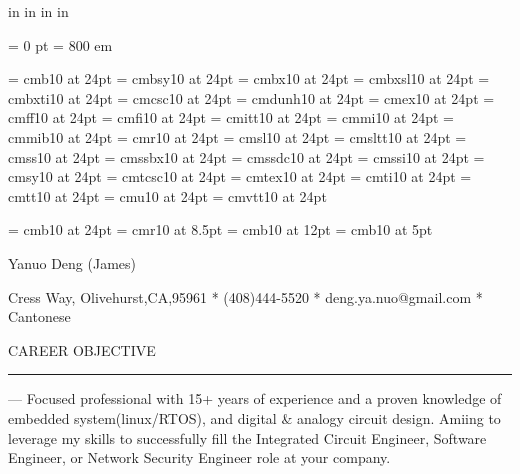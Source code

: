 \nopagenumbers

 in     %
 in    %
 in  %
 in  %

\parindent = 0 pt
\emergencystretch = 800 em


\font\FFcmb=      cmb10            at 24pt
\font\FFcmbsy=    cmbsy10          at 24pt
\font\FFcmbx=     cmbx10           at 24pt
\font\FFcmbxsl=   cmbxsl10         at 24pt
\font\FFcmbxti=   cmbxti10         at 24pt
\font\FFcmcsc=    cmcsc10          at 24pt
\font\FFcmdunh=   cmdunh10         at 24pt
\font\FFcmex=     cmex10           at 24pt
\font\FFcmff=     cmff10           at 24pt
\font\FFcmfi=     cmfi10           at 24pt
\font\FFcmitt=    cmitt10          at 24pt
\font\FFcmmi=     cmmi10           at 24pt
\font\FFcmmib=    cmmib10          at 24pt
\font\FFcmr=      cmr10            at 24pt
\font\FFcmsl=     cmsl10           at 24pt
\font\FFcmsltt=   cmsltt10         at 24pt
\font\FFcmss=     cmss10           at 24pt
\font\FFcmssbx=   cmssbx10         at 24pt
\font\FFcmssdc=   cmssdc10         at 24pt
\font\FFcmssi=    cmssi10          at 24pt
\font\FFcmsy=     cmsy10           at 24pt
\font\FFcmtcsc=   cmtcsc10         at 24pt
\font\FFcmtex=    cmtex10          at 24pt
\font\FFcmti=     cmti10           at 24pt
\font\FFcmtt=     cmtt10           at 24pt
\font\FFcmu=      cmu10            at 24pt
\font\FFcmvtt=    cmvtt10          at 24pt

\font\FFaa=      cmb10            at 24pt
\font\FFbb=      cmr10            at 8.5pt
\font\FFcc=      cmb10            at 12pt
\font\FFdd=      cmb10            at  5pt

\centerline{ \FFaa
Yanuo Deng (James)
}

\centerline{  Cress Way, Olivehurst,CA,95961
*
(408)444-5520
*
deng.ya.nuo@gmail.com
*
Cantonese
}

{ \FFdd \par \null }

{ \FFcc
CAREER OBJECTIVE
}

{\par\noindent\rule{\textwidth}{0.4pt}}

---
Focused professional with 15+ years of experience and a proven knowledge of embedded system(linux/RTOS), and digital \& analogy circuit design. Amiing to leverage my skills to successfully fill the Integrated Circuit Engineer, Software Engineer, or Network Security Engineer role at your company.

